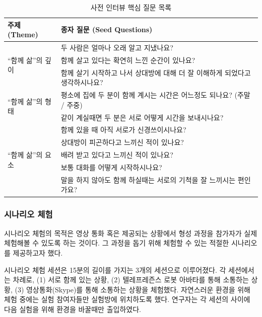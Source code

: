 \begin{table}
	\centering
	\caption{사전 인터뷰 핵심 질문 목록}
	\label{tab:userstudy_pre_questionnaire}
	\newcommand{\mr}[2]{\multirow{#1}{*}{#2}}
	\begin{tabular}{ll}
		\toprule
		\textbf{주제 (Theme)} & \textbf{종자 질문 (Seed Questions)} \\
		\midrule
		\mr{3}{``함께 삶''의 깊이}
		& 두 사람은 얼마나 오래 알고 지냈나요? \\
		& 함께 살고 있다는 확연히 느낀 순간이 있나요? \\
		& 함께 살기 시작하고 나서 상대방에 대해 더 잘 이해하게 되었다고 생각하시나요? \\
		\midrule
		\mr{2}{``함께 삶''의 형태}
		& 평소에 집에 두 분이 함께 계시는 시간은 어느정도 되나요? (주말 / 주중) \\
		& 같이 계실때면 두 분은 서로 어떻게 시간을 보내시나요? \\
		\midrule
		\mr{5}{``함께 삶''의 요소}
		& 함께 있을 때 아직 서로가 신경쓰이시나요? \\
		& 상대방이 피곤하다고 느끼신 적이 있나요? \\
		& 배려 받고 있다고 느끼신 적이 있나요? \\
		& 보통 대화를 어떻게 시작하시나요? \\
		& 말을 하지 않아도 함께 하실때는 서로의 기척을 잘 느끼시는 편인가요? \\
		\bottomrule
	\end{tabular}
\end{table}


\subsubsection{시나리오 체험}

시나리오 체험의 목적은 영상 통화 혹은 \sysname\이 제공되는 상황에서  형성 과정을 참가자가 실제 체험해볼 수 있도록 하는 것이다. 그 과정을 돕기 위해 \concept\를 체험할 수 있는 적절한 시나리오를 제공하고자 했다.

시나리오 체험 세션은 15분의 길이를 가지는 3개의 세션으로 이루어졌다. 각 세션에서는 차례로, (1) 서로 함께 있는 상황, (2) 텔레프레즌스 로봇 아바타를 통해 소통하는 상황, (3) 영상통화(Skype)를 통해 소통하는 상황을 체험했다. 자연스러운 환경을 위해 체험 중에는 실험 참여자들만 실험방에 위치하도록 했다. 연구자는 각 세션의 사이에 다음 실험을 위해 환경을 바꿀때만 출입하였다.

